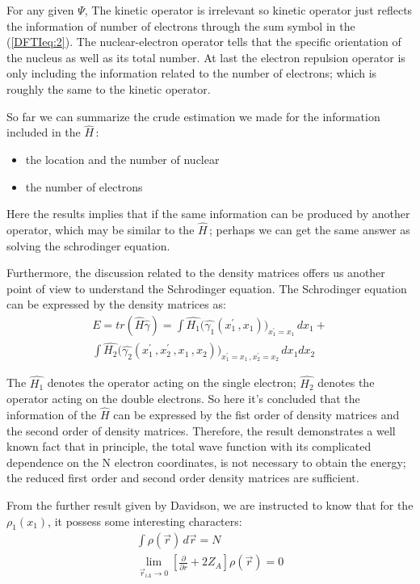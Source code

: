 For any given $\Psi$, The kinetic operator is irrelevant so kinetic
operator just reflects the information of number of electrons
through the sum symbol in the (\ref{DFTIeq:2}). The nuclear-electron
operator tells that the specific orientation of the nucleus as well
as its total number. At last the electron repulsion operator is only
including the information related to the number of electrons; which
is roughly the same to the kinetic operator.

So far we can summarize the crude estimation we made for the
information included in the $\hat{H}$\,:
\begin{itemize}
\item the location and the number of nuclear
\item the number of electrons
\end{itemize}

Here the results implies that if the same information can be produced
by another operator, which may be similar to the $\hat{H}$\,; perhaps
we can get the same answer as solving the schrodinger equation.

Furthermore, the discussion related to the density matrices offers
us another point of view to understand the Schrodinger equation. The
Schrodinger equation can be expressed by the density matrices as:
\begin{eqnarray}\label{DFTIeq:5}
  E=tr(\hat{H}\hat{\gamma})=\int\hat{H_{1}}
  \Big(\hat{\gamma_{1}}(x_{1}^{'}\,,x_{1})\Big)_{x_{1}^{'}=x_{1}}\,dx_{1}+
  \nonumber \\
  \int\hat{H_{2}}\Big(\hat{\gamma_{2}}
  (x_{1}^{'}\,,x_{2}^{'}\,,x_{1}\,,x_{2})\Big)_{x_{1}^{'}
    =x_{1}\,,x_{2}^{'}=x_{2}}\,dx_{1}dx_{2}
\end{eqnarray}

The $\hat{H_{1}}$ denotes the operator acting on the single
electron; $\hat{H_{2}}$ denotes the operator acting on the double
electrons. So here it's concluded that the information of the
$\hat{H}$ can be expressed by the fist order of density matrices and
the second order of density matrices. Therefore, the result
demonstrates a well known fact that in principle, the total wave
function with its complicated dependence on the N electron
coordinates, is not necessary to obtain the energy; the reduced
first order and second order density matrices are sufficient.

From the further result given by Davidson\cite{Davidson}, we are
instructed to know that for the $\rho_{1}(x_{1})$, it possess some
interesting characters:
\begin{eqnarray}\label{}
  \int\rho(\vec{r})\,d\vec{r}=N \\
  \lim_{\vec{r}_{iA}\rightarrow 0}\left
    [ {\frac{\partial}{\partial r}}+2Z_{A}\right ]\rho(\vec{r})=0
\end{eqnarray}

